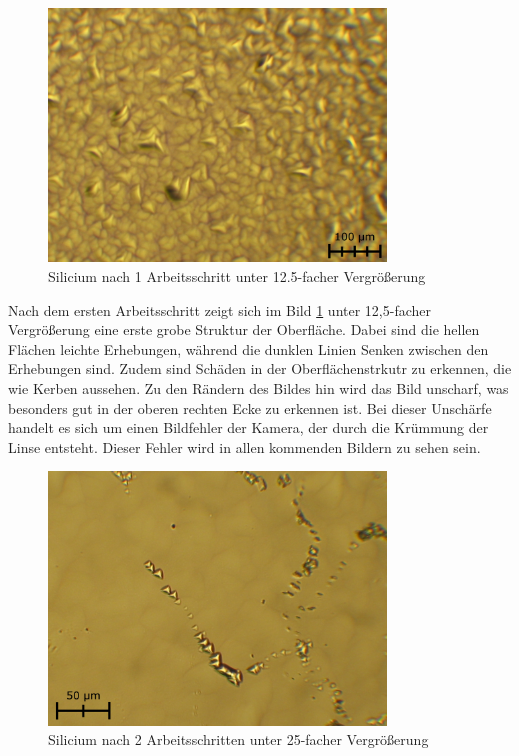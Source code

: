 \documentclass[german, %
parskip=full, %
bibliography=totoc, %
]{scrartcl}
\begin{document}
\begin{figure}[ht] 
  \centering
     \includegraphics[width=0.8\textwidth]{Silicium_1_12}
  \caption{Silicium nach 1 Arbeitsschritt unter 12.5-facher Vergrößerung}
  \label{fig:sil112}
\end{figure}

Nach dem ersten Arbeitsschritt zeigt sich im Bild \ref{fig:sil112} unter 12,5-facher Vergrößerung eine erste grobe Struktur der Oberfläche. Dabei sind die hellen Flächen leichte Erhebungen, während die dunklen Linien Senken zwischen den Erhebungen sind. Zudem sind Schäden in der Oberflächenstrkutr zu erkennen, die wie Kerben aussehen. Zu den Rändern des Bildes hin wird das Bild unscharf, was besonders gut in der oberen rechten Ecke zu erkennen ist. Bei dieser Unschärfe handelt es sich um einen Bildfehler der Kamera, der durch die Krümmung der Linse entsteht. Dieser Fehler wird in allen kommenden Bildern zu sehen sein.

\begin{figure}[ht] 
  \centering
     \includegraphics[width=0.8\textwidth]{Silicium_2_25}
  \caption{Silicium nach 2 Arbeitsschritten unter 25-facher Vergrößerung}
  \label{fig:sil225}
\end{figure}
\end{document}
